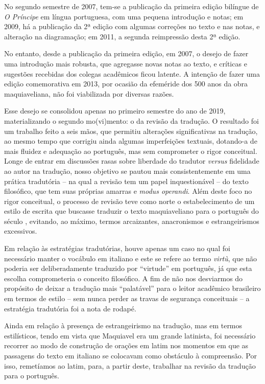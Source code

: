 No segundo semestre de 2007, tem-se a publicação da primeira edição
bilíngue de \emph{O Príncipe} em língua portuguesa, com uma pequena
introdução e notas; em 2009, há a publicação da 2ª edição com algumas
correções no texto e nas notas, e alteração na diagramação; em 2011, a
segunda reimpressão desta 2ª edição.

No entanto, desde a publicação da primeira edição, em 2007, o desejo de
fazer uma introdução mais robusta, que agregasse novas notas ao texto, e
críticas e sugestões recebidas dos colegas acadêmicos ficou latente. A
intenção de fazer uma edição comemorativa em 2013, por ocasião da
efeméride dos 500 anos da obra maquiaveliana, não foi viabilizada por
diversas razões.

Esse desejo se consolidou apenas no primeiro semestre do ano de 2019,
materializando o segundo mo(vi)mento: o da revisão da tradução. O
resultado foi um trabalho feito a seis mãos, que permitiu alterações
significativas na tradução, ao mesmo tempo que corrigiu ainda algumas
imperfeições textuais, dotando-a de mais fluidez e adequação ao
português, mas sem comprometer o rigor conceitual. Longe de entrar em
discussões rasas sobre liberdade do tradutor \emph{versus} fidelidade ao
autor na tradução, nosso objetivo se pautou mais consistentemente em uma
prática tradutória -- na qual a revisão tem um papel inquestionável --
do texto filosófico, que tem suas próprias amarras e \emph{modus
operandi}. Além deste foco no rigor conceitual, o processo de revisão
teve como norte o estabelecimento de um estilo de escrita que buscasse
traduzir o texto maquiaveliano para o português do século , evitando,
ao máximo, termos arcaizantes, anacronismos e estrangeirismos
excessivos.

Em relação às estratégias tradutórias, houve apenas um caso no qual foi
necessário manter o vocábulo em italiano e este se refere ao termo
\emph{virtù}, que não poderia ser deliberadamente traduzido por
``virtude'' em português, já que esta escolha comprometeria o conceito
filosófico. A fim de não nos desviarmos do propósito de deixar a
tradução mais ``palatável'' para o leitor acadêmico brasileiro em termos
de estilo -- sem nunca perder as travas de segurança conceituais -- a
estratégia tradutória foi a nota de rodapé.

Ainda em relação à presença de estrangeirismo na tradução, mas em termos
estilísticos, tendo em vista que Maquiavel era um grande latinista, foi
necessário recorrer ao modo de construção de orações em latim nos
momentos em que as passagens do texto em italiano se colocavam como
obstáculo à compreensão. Por isso, remetíamos ao latim, para, a partir
deste, trabalhar na revisão da tradução para o português.

